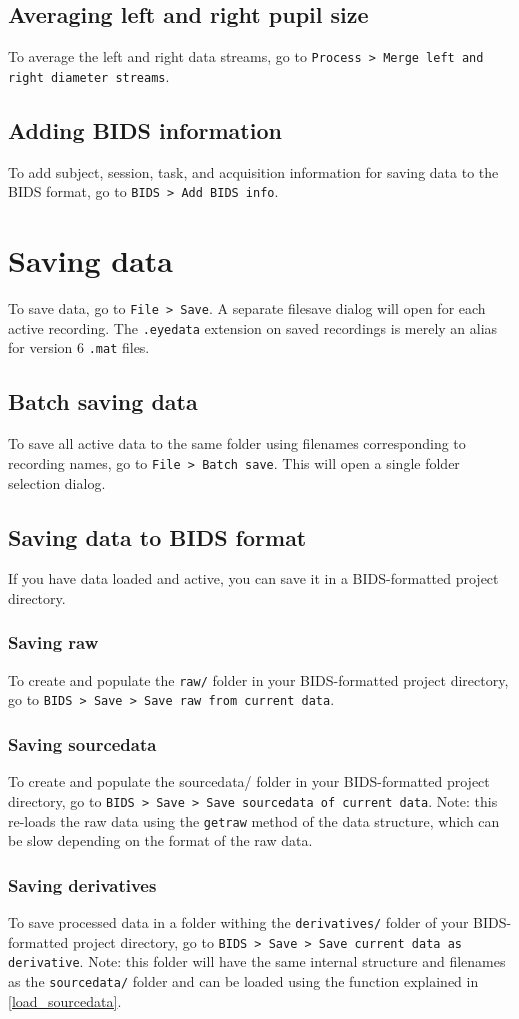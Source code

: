 \documentclass{article}
\begin{document}
\subsection{Averaging left and right pupil size}
To average the left and right data streams, go to \texttt{Process > Merge left and right diameter streams}.
\subsection{Adding BIDS information}
To add subject, session, task, and acquisition information for saving data to the BIDS format, go to \texttt{BIDS > Add BIDS info}.
\section{Saving data}
To save data, go to \texttt{File > Save}. A separate filesave dialog will open for each active recording. The \texttt{.eyedata} extension on saved recordings is merely an alias for version 6 \texttt{.mat} files.
\subsection{Batch saving data}
To save all active data to the same folder using filenames corresponding to recording names, go to \texttt{File > Batch save}. This will open a single folder selection dialog.
\subsection{Saving data to BIDS format}
If you have data loaded and active, you can save it in a BIDS-formatted project directory.
\subsubsection{Saving raw}
To create and populate the \texttt{raw/} folder in your BIDS-formatted project directory, go to \texttt{BIDS > Save > Save raw from current data}.
\subsubsection{Saving sourcedata}
To create and populate the sourcedata/ folder in your BIDS-formatted project directory, go to \texttt{BIDS > Save > Save sourcedata of current data}. Note: this re-loads the raw data using the \texttt{getraw} method of the data structure, which can be slow depending on the format of the raw data.
\subsubsection{Saving derivatives} \label{saving_derivatives}
To save processed data in a folder withing the \texttt{derivatives/} folder of your BIDS-formatted project directory, go to \texttt{BIDS > Save > Save current data as derivative}. Note: this folder will have the same internal structure and filenames as the \texttt{sourcedata/} folder and can be loaded using the function explained in \ref{load_sourcedata}.
\end{document}
